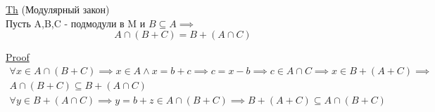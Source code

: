 \documentclass[a4paper]{article}
\begin{document}
\begin{tcolorbox}
    \underline{Th} (Модулярный закон) \\
    Пусть A,B,C - подмодули в M и $ B \subseteq A \implies $ 
    \[
        A \cap (B + C) = B + (A \cap C)
    \]

    \underline{Proof}
    \begin{equation*}
        \begin{aligned}
        \forall x \in A \cap (B + C) \implies x \in A \land x = b+c \implies
        c = x - b \implies c \in A \cap C \implies x \in B + (A + C) \implies\\
        A \cap (B + C) \subseteq B + (A \cap C)
        \end{aligned}
    \end{equation*}
    \begin{equation*}
        \begin{aligned}
            \forall y \in B + (A \cap C) \implies y = b + z \in A \cap (B + C) \implies
            B + (A +C) \subseteq A \cap (B + C)
        \end{aligned}
    \end{equation*}
\end{tcolorbox}
\end{document}
